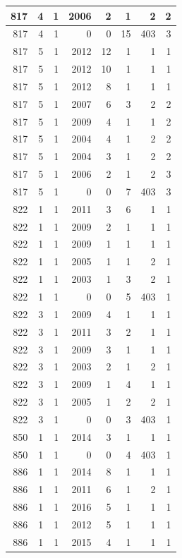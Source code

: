 \documentclass[11pt,]{book}
\begin{document}
\begin{table}
\begin{tabular}[t]{r|r|r|r|r|r|r|r}
817 & 4 & 1 & 2006 & 2 & 1 & 2 & 2\\
\hline
817 & 4 & 1 & 0 & 0 & 15 & 403 & 3\\
\hline
817 & 5 & 1 & 2012 & 12 & 1 & 1 & 1\\
\hline
817 & 5 & 1 & 2012 & 10 & 1 & 1 & 1\\
\hline
817 & 5 & 1 & 2012 & 8 & 1 & 1 & 1\\
\hline
817 & 5 & 1 & 2007 & 6 & 3 & 2 & 2\\
\hline
817 & 5 & 1 & 2009 & 4 & 1 & 1 & 2\\
\hline
817 & 5 & 1 & 2004 & 4 & 1 & 2 & 2\\
\hline
817 & 5 & 1 & 2004 & 3 & 1 & 2 & 2\\
\hline
817 & 5 & 1 & 2006 & 2 & 1 & 2 & 3\\
\hline
817 & 5 & 1 & 0 & 0 & 7 & 403 & 3\\
\hline
822 & 1 & 1 & 2011 & 3 & 6 & 1 & 1\\
\hline
822 & 1 & 1 & 2009 & 2 & 1 & 1 & 1\\
\hline
822 & 1 & 1 & 2009 & 1 & 1 & 1 & 1\\
\hline
822 & 1 & 1 & 2005 & 1 & 1 & 2 & 1\\
\hline
822 & 1 & 1 & 2003 & 1 & 3 & 2 & 1\\
\hline
822 & 1 & 1 & 0 & 0 & 5 & 403 & 1\\
\hline
822 & 3 & 1 & 2009 & 4 & 1 & 1 & 1\\
\hline
822 & 3 & 1 & 2011 & 3 & 2 & 1 & 1\\
\hline
822 & 3 & 1 & 2009 & 3 & 1 & 1 & 1\\
\hline
822 & 3 & 1 & 2003 & 2 & 1 & 2 & 1\\
\hline
822 & 3 & 1 & 2009 & 1 & 4 & 1 & 1\\
\hline
822 & 3 & 1 & 2005 & 1 & 2 & 2 & 1\\
\hline
822 & 3 & 1 & 0 & 0 & 3 & 403 & 1\\
\hline
850 & 1 & 1 & 2014 & 3 & 1 & 1 & 1\\
\hline
850 & 1 & 1 & 0 & 0 & 4 & 403 & 1\\
\hline
886 & 1 & 1 & 2014 & 8 & 1 & 1 & 1\\
\hline
886 & 1 & 1 & 2011 & 6 & 1 & 2 & 1\\
\hline
886 & 1 & 1 & 2016 & 5 & 1 & 1 & 1\\
\hline
886 & 1 & 1 & 2012 & 5 & 1 & 1 & 1\\
\hline
886 & 1 & 1 & 2015 & 4 & 1 & 1 & 1\\
\hline

\end{tabular}
\end{table}
\end{document}
